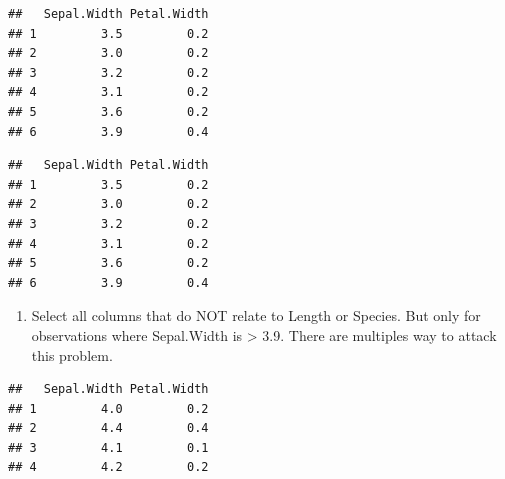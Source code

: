 \documentclass[]{book}
\newenvironment{Shaded}{\begin{snugshade}}{\end{snugshade}}
\newcommand{\CommentTok}[1]{\textcolor[rgb]{0.56,0.35,0.01}{\textit{#1}}}
\newcommand{\FloatTok}[1]{\textcolor[rgb]{0.00,0.00,0.81}{#1}}
\newcommand{\KeywordTok}[1]{\textcolor[rgb]{0.13,0.29,0.53}{\textbf{#1}}}
\newcommand{\NormalTok}[1]{#1}
\newcommand{\OperatorTok}[1]{\textcolor[rgb]{0.81,0.36,0.00}{\textbf{#1}}}
\newcommand{\StringTok}[1]{\textcolor[rgb]{0.31,0.60,0.02}{#1}}
\providecommand{\tightlist}{%
  \setlength{\itemsep}{0pt}\setlength{\parskip}{0pt}}
\begin{document}
\begin{verbatim}
##   Sepal.Width Petal.Width
## 1         3.5         0.2
## 2         3.0         0.2
## 3         3.2         0.2
## 4         3.1         0.2
## 5         3.6         0.2
## 6         3.9         0.4
\end{verbatim}

\begin{Shaded}
\end{Shaded}

\begin{verbatim}
##   Sepal.Width Petal.Width
## 1         3.5         0.2
## 2         3.0         0.2
## 3         3.2         0.2
## 4         3.1         0.2
## 5         3.6         0.2
## 6         3.9         0.4
\end{verbatim}

\begin{enumerate}
\def\labelenumi{\arabic{enumi})}
\setcounter{enumi}{6}
\tightlist
\item
  Select all columns that do NOT relate to Length or Species. But only for observations where Sepal.Width is \textgreater{} 3.9. There are multiples way to attack this problem.
\end{enumerate}

\begin{Shaded}
\end{Shaded}

\begin{verbatim}
##   Sepal.Width Petal.Width
## 1         4.0         0.2
## 2         4.4         0.4
## 3         4.1         0.1
## 4         4.2         0.2
\end{verbatim}
\end{document}
